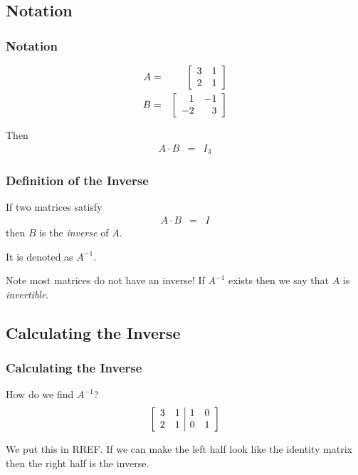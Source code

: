 \subsection{Notation}

\begin{frame}
  \frametitle{Notation}

  \begin{eqnarray*}
    A & = & \left[ \begin{array}{rr} 3 & 1 \\ 2 & 1 \end{array} \right] \\
    B & = & \left[ \begin{array}{rr} 1 & -1 \\ -2 & 3 \end{array} \right] 
  \end{eqnarray*}

  Then
  \begin{eqnarray*}
    A\cdot B & = & I_3
  \end{eqnarray*}

\end{frame}


\begin{frame}
  \frametitle{Definition of the Inverse}

  If two matrices satisfy
  \begin{eqnarray*}
    A\cdot B & = & I
  \end{eqnarray*}
  then $B$ is the \textit{inverse} of $A$.

  It is denoted as $A^{-1}$.

  Note most matrices do not have an inverse! If $A^{-1}$ exists then
  we say that $A$ is \textit{invertible}.

\end{frame}

\subsection{Calculating the Inverse}

\begin{frame}
  \frametitle{Calculating the Inverse}

  How do we find $A^{-1}$?
  \begin{eqnarray*}
    \left[ \begin{array}{rr|rr}
    3 & 1 & 1 & 0 \\ 
    2 & 1 & 0 & 1 \\ 
    \end{array} \right]
  \end{eqnarray*}

  We put this in RREF. If we can make the left half look like the
  identity matrix then the right half is the inverse.

\end{frame}



